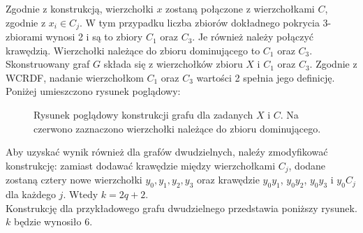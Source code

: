 Zgodnie z konstrukcją, wierzchołki $x$ zostaną połączone z wierzchołkami $C$, zgodnie z  $x_i \in C_j$. W tym przypadku liczba zbiorów dokładnego pokrycia 3-zbiorami wynosi 2 i są to zbiory $C_1$ oraz $C_3$. Je również należy połączyć krawędzią. Wierzchołki należące do zbioru dominującego to $C_1$ oraz $C_3$. Skonstruowany graf $G$ składa się z wierzchołków zbioru $X$ i $C_1$ oraz $C_3$. Zgodnie z WCRDF, nadanie wierzchołkom $C_1$ oraz $C_3$ wartości 2 spełnia jego definicję. \\
Poniżej umieszczono rysunek poglądowy:

\begin{figure}[H]
\begin{center}
\caption{Rysunek poglądowy konstrukcji grafu dla zadanych $X$ i $C$. Na czerwono zaznaczono wierzchołki należące do zbioru dominującego.}
\end{center}
\end{figure}

Aby uzyskać wynik również dla grafów dwudzielnych, naleźy zmodyfikować konstrukcję: zamiast dodawać krawędzie między wierzchołkami $C_j$, dodane zostaną cztery nowe wierzchołki $y_0, y_1, y_2, y_3$ oraz krawędzie $y_0y_1$, $y_0y_2$, $y_0y_3$ i $y_0C_j$ dla każdego $j$. Wtedy $k = 2q + 2$.\\

Konstrukcję dla przykładowego grafu dwudzielnego przedstawia poniższy rysunek. $k$ będzie wynosiło 6.\\

